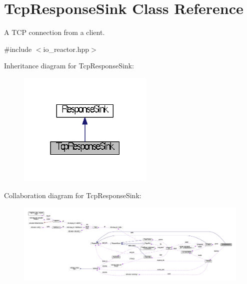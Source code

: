 \hypertarget{classTcpResponseSink}{\section{Tcp\+Response\+Sink Class Reference}
\label{classTcpResponseSink}
}


A T\+C\+P connection from a client.  




{\ttfamily \#include $<$io\+\_\+reactor.\+hpp$>$}



Inheritance diagram for Tcp\+Response\+Sink\+:
\nopagebreak
\begin{figure}[H]
\begin{center}
\leavevmode
\includegraphics[width=183pt]{classTcpResponseSink__inherit__graph}
\end{center}
\end{figure}


Collaboration diagram for Tcp\+Response\+Sink\+:
\nopagebreak
\begin{figure}[H]
\begin{center}
\leavevmode
\includegraphics[width=350pt]{classTcpResponseSink__coll__graph}
\end{center}
\end{figure}
